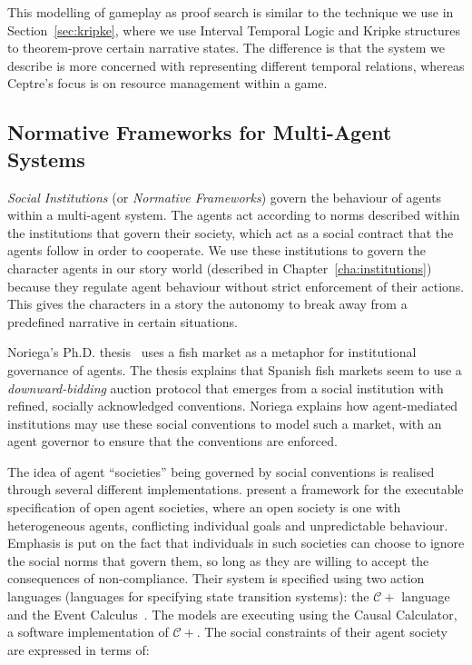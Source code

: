 \documentclass[11pt]{report}
\begin{document}
This modelling of gameplay as proof search is similar to the technique we use in
Section~\ref{sec:kripke}, where we use Interval Temporal Logic and Kripke structures to
theorem-prove certain narrative states. The difference is that the system we
describe is more concerned with representing different temporal relations,
whereas Ceptre's focus is on resource management within a game.

\subsection{Normative Frameworks for Multi-Agent Systems}\label{sec:lit-insts}
\emph{Social Institutions} (or \emph{Normative Frameworks}) govern the behaviour
of agents within a multi-agent system. The agents act according to norms
described within the institutions that govern their society, which act as a
social contract that the agents follow in order to cooperate. We use these
institutions to govern the character agents in our story world (described in
Chapter~\ref{cha:institutions}) because they regulate agent behaviour without
strict enforcement of their actions. This gives the characters in a story the
autonomy to break away from a predefined narrative in certain situations.

Noriega's Ph.D. thesis~\citep{noriega1999agent} uses a fish market as a metaphor for
institutional governance of agents. The thesis explains that Spanish fish
markets seem to use a \emph{downward-bidding} auction protocol that emerges from
a social institution with refined, socially acknowledged conventions. Noriega
explains how agent-mediated institutions may use these social conventions to
model such a market, with an agent governor to ensure that the conventions are enforced.

The idea of agent ``societies'' being governed by social conventions is realised
through several different implementations. \citet{artikis2009specifying} present
a framework for the executable specification of open agent societies, where an
open society is one with heterogeneous agents, conflicting individual goals and
unpredictable behaviour. Emphasis is put on the fact that individuals in such
societies can choose to ignore the social norms that govern them, so long as
they are willing to accept the consequences of non-compliance. Their system is
specified using two action languages (languages for specifying state transition
systems): the $\mathcal{C}+$ language~\citep{giunchiglia2001causal, giunchiglia2004nonmonotonic} and the Event
Calculus~\citep{kowalski1986logic, shanahan1999event}. The models are
executing using the Causal Calculator, a software implementation of
$\mathcal{C}+$. The social constraints of their agent society are expressed in
terms of:
\end{document}
